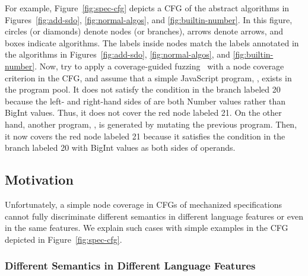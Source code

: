 
For example, Figure~\ref{fig:spec-cfg} depicts a CFG of the abstract algorithms
in Figures~\ref{fig:add-sdo}, \ref{fig:normal-algos}, and
\ref{fig:builtin-number}.
%
In this figure, circles (or diamonds) denote nodes (or branches), arrows denote
arrows, and boxes indicate algorithms.
%
The labels inside nodes match the labels annotated in the algorithms in
Figures~\ref{fig:add-sdo}, \ref{fig:normal-algos}, and \ref{fig:builtin-number}.
%
Now, try to apply a coverage-guided fuzzing~\cite{afl} with a node coverage
criterion in the CFG, and assume that a simple JavaScript program, , exists in the program pool.
%
It does not satisfy the condition in the branch labeled 20 because the left- and
right-hand sides of  are both Number values rather than BigInt
values.
%
Thus, it does not cover the red node labeled 21.
%
On the other hand, another program, , is generated by mutating
the previous program.
%
Then, it now covers the red node labeled 21 because it satisfies the condition
in the branch labeled 20 with BigInt values as both sides of operands.


\subsection{Motivation}\label{sec:motiv}

Unfortunately, a simple node coverage in CFGs of mechanized specifications
cannot fully discriminate different semantics in different language features or
even in the same features.
%
We explain such cases with simple examples in the CFG depicted in
Figure~\ref{fig:spec-cfg}.


\subsubsection{Different Semantics in Different Language
Features}\label{sec:diff-feat}

